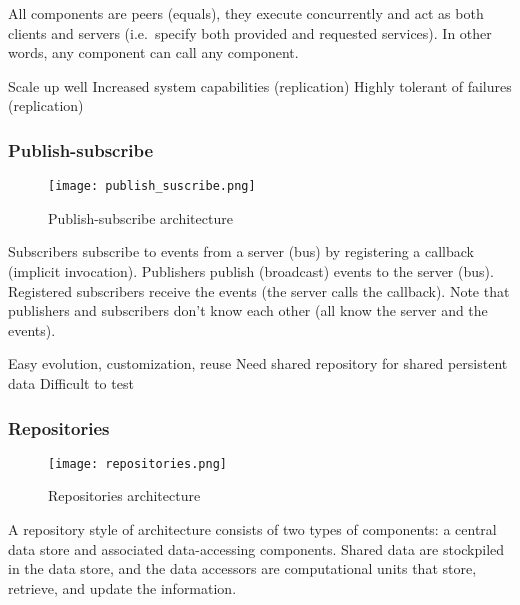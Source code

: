 All components are peers (equals), they execute concurrently and act as both
clients and servers (i.e.\ specify both provided and requested services).
\newline
In other words, any component can call any component.

\begin{itemize}
    \proitem{} Scale up well
    \proitem{} Increased system capabilities (replication)
    \proitem{} Highly tolerant of failures (replication)
\end{itemize}

\subsubsection{Publish-subscribe}

\begin{figure}[!ht]
    \centering
    \texttt{[image: publish\_suscribe.png]}
    \caption{Publish-subscribe architecture}
\end{figure}

Subscribers subscribe to events from a server (bus) by registering a callback
(implicit invocation). Publishers publish (broadcast) events to the server
(bus). Registered subscribers receive the events (the server calls the
callback).\newline
Note that publishers and subscribers don't know each other (all know the server
and the events).

\begin{itemize}
    \proitem{} Easy evolution, customization, reuse
    \consitem{} Need shared repository for shared persistent data
    \consitem{} Difficult to test
\end{itemize}

\subsubsection{Repositories}

\begin{figure}[!ht]
    \centering
    \texttt{[image: repositories.png]}
    \caption{Repositories architecture}
\end{figure}

A repository style of architecture consists of two types of components: a
central data store and associated data-accessing components. 
Shared data are
stockpiled in the data store, and the data accessors are computational units
that store, retrieve, and update the information. \newline

